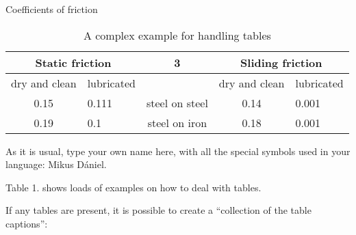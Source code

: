 \documentclass{article}
\begin{document}
\begin{table}[]
    \caption{A complex example for handling tables}
    \centering
    \renewcommand{\caption}[1]{#1}
   \caption{Coefficients of friction} \\
    \begin{tabular}{|c|l|c|c|l|}
    \hline
    \hline
        \multicolumn{2}{|c|}{Static friction} & 3 & \multicolumn{2}{|c|}{Sliding friction}  \\
        \hline 
        \hline
        dry and clean  & lubricated &  & dry and clean & lubricated  \\
        \hline
        \hline
        0.15 & 0.111 & steel on steel & 0.14 & 0.001  \\
        \hline
        \hline
        0.19  & 0.1 & steel on iron & 0.18 & 0.001 \\
        \hline
        \hline
    \end{tabular}
    \label{tab:my_label}
\end{table}
\par
As it is usual, type your own name here, with all the special symbols used in your language: Mikus Dániel. \par
Table 1. shows loads of examples on how to deal with tables. \par
If any tables are present, it is possible to create a “collection of the table captions”:
\listoftables
\end{document}
